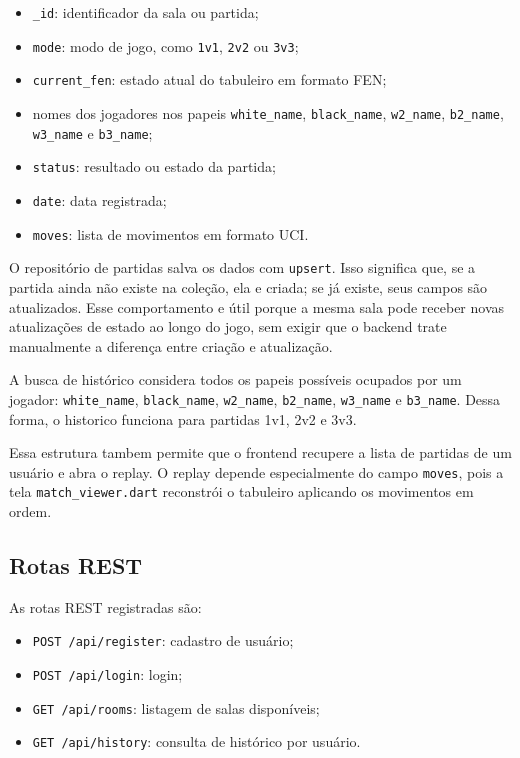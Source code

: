 \documentclass[12pt]{article}
\begin{document}
\begin{itemize}
    \item \texttt{\_id}: identificador da sala ou partida;
    \item \texttt{mode}: modo de jogo, como \texttt{1v1}, \texttt{2v2} ou \texttt{3v3};
    \item \texttt{current\_fen}: estado atual do tabuleiro em formato FEN;
    \item nomes dos jogadores nos papeis \texttt{white\_name}, \texttt{black\_name}, \texttt{w2\_name}, \texttt{b2\_name}, \texttt{w3\_name} e \texttt{b3\_name};
    \item \texttt{status}: resultado ou estado da partida;
    \item \texttt{date}: data registrada;
    \item \texttt{moves}: lista de movimentos em formato UCI.
\end{itemize}

O repositório de partidas salva os dados com \texttt{upsert}. Isso significa que, se a partida ainda não existe na coleção, ela e criada; se já existe, seus campos são atualizados. Esse comportamento e útil porque a mesma sala pode receber novas atualizações de estado ao longo do jogo, sem exigir que o backend trate manualmente a diferença entre criação e atualização.

A busca de histórico considera todos os papeis possíveis ocupados por um jogador: \texttt{white\_name}, \texttt{black\_name}, \texttt{w2\_name}, \texttt{b2\_name}, \texttt{w3\_name} e \texttt{b3\_name}. Dessa forma, o historico funciona para partidas 1v1, 2v2 e 3v3.

Essa estrutura tambem permite que o frontend recupere a lista de partidas de um usuário e abra o replay. O replay depende especialmente do campo \texttt{moves}, pois a tela \texttt{match\_viewer.dart} reconstrói o tabuleiro aplicando os movimentos em ordem.

\subsection{Rotas REST}

As rotas REST registradas são:

\begin{itemize}
    \item \texttt{POST /api/register}: cadastro de usuário;
    \item \texttt{POST /api/login}: login;
    \item \texttt{GET /api/rooms}: listagem de salas disponíveis;
    \item \texttt{GET /api/history}: consulta de histórico por usuário.
\end{itemize}
\end{document}
